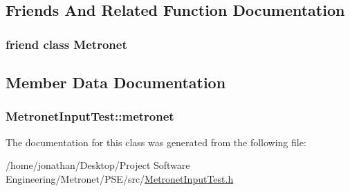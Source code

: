 \subsection{Friends And Related Function Documentation}
\subsubsection[{\texorpdfstring{Metronet}{Metronet}}]{\setlength{\rightskip}{0pt plus 5cm}friend class {\bf Metronet}\hspace{0.3cm}{\ttfamily [friend]}}\hypertarget{class_metronet_input_test_a07c94fb69880743e62f64a941fc2d4ab}{}\label{class_metronet_input_test_a07c94fb69880743e62f64a941fc2d4ab}


\subsection{Member Data Documentation}
\subsubsection[{\texorpdfstring{metronet}{metronet}}]{ Metronet\+Input\+Test\+::metronet\hspace{0.3cm}{\ttfamily [protected]}}\hypertarget{class_metronet_input_test_ab922ed7c2e4f1dfee1ed7df1eb3a13b4}{}\label{class_metronet_input_test_ab922ed7c2e4f1dfee1ed7df1eb3a13b4}


The documentation for this class was generated from the following file\+:\begin{DoxyCompactItemize}
\item 
/home/jonathan/\+Desktop/\+Project Software Engineering/\+Metronet/\+P\+S\+E/src/\hyperlink{_metronet_input_test_8h}{Metronet\+Input\+Test.\+h}\end{DoxyCompactItemize}
